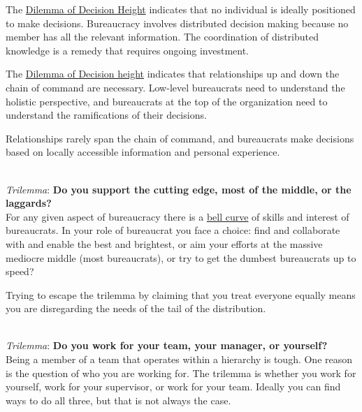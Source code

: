 The \hyperref[table:decisions-low-vs-high]{Dilemma of Decision Height} indicates that no individual is ideally positioned to make decisions. Bureaucracy involves distributed decision making because no member has all the relevant information. The coordination of distributed knowledge is a remedy that requires ongoing investment.

The \hyperref[table:decisions-low-vs-high]{Dilemma of Decision height} indicates that relationships up and down the chain of command are necessary. Low-level bureaucrats need to understand the holistic perspective, and bureaucrats at the top of the organization need to understand the ramifications of their decisions.

Relationships rarely span the chain of command, and bureaucrats make decisions based on locally accessible information and personal experience. 



\ \\

\textit{Trilemma}: \textbf{Do you support the cutting edge, most of the middle, or the laggards?}\\
For any given aspect of bureaucracy there is a \href{https://en.wikipedia.org/wiki/Normal_distribution}{bell curve} 
of skills and interest of bureaucrats. In your role of bureaucrat you face a choice: find and collaborate with and enable the best and brightest, or aim your efforts at the massive mediocre middle (most bureaucrats), or try to get the dumbest bureaucrats up to speed? 

Trying to escape the trilemma by claiming that you treat everyone equally means you are disregarding the needs of the tail of the distribution. 

\ \\

\textit{Trilemma}: \textbf{Do you work for your team, your manager, or yourself?} \\
Being a member of a team that operates within a hierarchy is tough. One reason is the question of who you are working for. The trilemma is whether you work for yourself, work for your supervisor, or work for your team.  Ideally you can find ways to do all three, but that is not always the case. 

